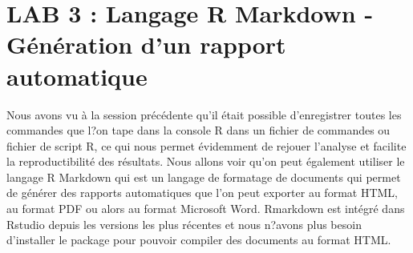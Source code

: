 \newpage

\section{LAB 3 : Langage R Markdown - Génération d'un rapport automatique}

Nous avons vu à la session précédente qu'il était possible d'enregistrer toutes les commandes que l?on tape dans la console R dans un fichier de commandes ou fichier de script R, ce qui nous permet évidemment de rejouer l'analyse et facilite la reproductibilité des résultats.\newline
Nous allons voir qu'on peut également utiliser le langage R Markdown qui est un langage de formatage de documents qui permet de générer des rapports automatiques que l'on peut exporter au format HTML, au format PDF ou alors au format Microsoft Word.\newline
Rmarkdown est intégré dans Rstudio depuis les versions les plus récentes et nous n?avons plus besoin d'installer le package pour pouvoir compiler des documents au format HTML.

